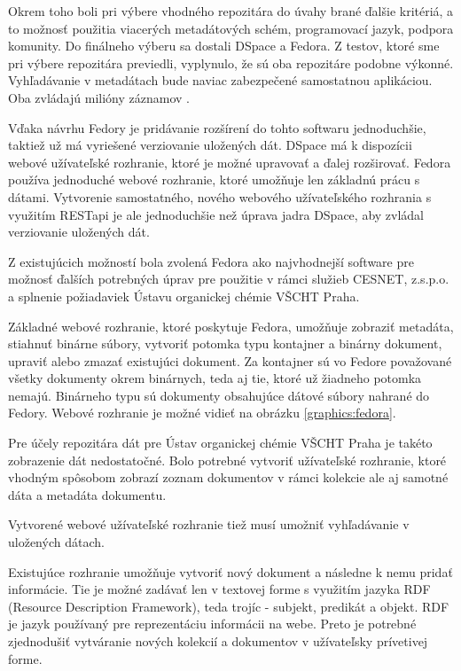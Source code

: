 \documentclass[thesis=M,slovak]{FITthesis}[2013/05/06]
\begin{document}
Okrem toho boli pri výbere vhodného repozitára do úvahy brané ďalšie kritériá, a to možnosť použitia viacerých metadátových schém, programovací jazyk, podpora komunity. Do finálneho výberu sa dostali DSpace a Fedora. Z testov, ktoré sme pri výbere repozitára previedli, vyplynulo, že sú oba repozitáre podobne výkonné. Vyhľadávanie v metadátach bude naviac zabezpečené samostatnou aplikáciou. Oba zvládajú milióny záznamov \cite{Fedora} \cite[s.~213]{DigitalLibrary}.

Vďaka návrhu Fedory je pridávanie rozšírení do tohto softwaru jednoduchšie, taktiež už má vyriešené verziovanie uložených dát. DSpace má k dispozícii webové užívateľské rozhranie, ktoré je možné upravovať a ďalej rozširovať. Fedora používa jednoduché webové rozhranie, ktoré umožňuje len základnú prácu s dátami. Vytvorenie samostatného, nového webového užívateľského rozhrania s využitím RESTapi je ale jednoduchšie než úprava jadra DSpace, aby zvládal verziovanie uložených dát.

Z existujúcich možností bola zvolená Fedora ako najvhodnejší software pre možnosť ďalších potrebných úprav pre použitie v rámci služieb CESNET, z.s.p.o. a splnenie požiadaviek Ústavu organickej chémie VŠCHT Praha.

Základné webové rozhranie, ktoré poskytuje Fedora, umožňuje zobraziť metadáta, stiahnuť binárne súbory, vytvoriť potomka typu kontajner a binárny dokument, upraviť alebo zmazať existujúci dokument. Za kontajner sú vo Fedore považované všetky dokumenty okrem binárnych, teda aj tie, ktoré už žiadneho potomka nemajú. Binárneho typu sú dokumenty obsahujúce dátové súbory nahrané do Fedory. Webové rozhranie je možné vidieť na obrázku \ref{graphics:fedora}.

Pre účely repozitára dát pre Ústav organickej chémie VŠCHT Praha je takéto zobrazenie dát nedostatočné. Bolo potrebné vytvoriť užívateľské rozhranie, ktoré vhodným spôsobom zobrazí zoznam dokumentov v rámci kolekcie ale aj samotné dáta a metadáta dokumentu.

Vytvorené webové užívateľské rozhranie tiež musí umožniť vyhľadávanie v uložených dátach.

Existujúce rozhranie umožňuje vytvoriť nový dokument a následne k nemu pridať informácie. Tie je možné zadávať len v textovej forme s využitím jazyka RDF (Resource Description Framework), teda trojíc - subjekt, predikát a objekt. RDF je jazyk používaný pre reprezentáciu informácii na webe. \cite{RDF} Preto je potrebné zjednodušiť vytváranie nových kolekcií a dokumentov v užívateľsky prívetivej forme.
\end{document}
